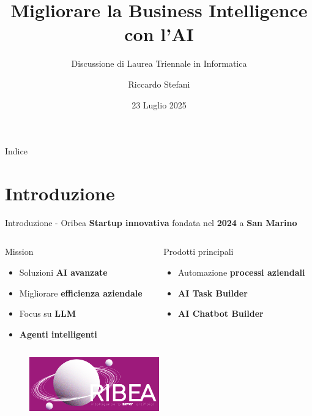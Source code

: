 \documentclass{beamer}
\title{Migliorare la Business Intelligence con l'AI}
\subtitle{Discussione di Laurea Triennale in Informatica}
\author{Riccardo Stefani}
\date{23 Luglio 2025}
\begin{document}
	\maketitle

	\begin{frame}{Indice}
		\tableofcontents
	\end{frame}


	\section{Introduzione}

	\begin{frame}{Introduzione - Oribea}
		\textbf{Startup innovativa} fondata nel \textbf{2024} a \textbf{San Marino}

		\begin{columns}
			\begin{column}{0.5\textwidth}
				\begin{alertblock}{Mission}
					\begin{itemize}
						\item Soluzioni \textbf{AI avanzate}
						\item Migliorare \textbf{efficienza aziendale}
						\item Focus su \textbf{LLM}
						\item \textbf{Agenti intelligenti}
					\end{itemize}
				\end{alertblock}
			\end{column}
			\begin{column}{0.5\textwidth}
				\begin{exampleblock}{Prodotti principali}
					\begin{itemize}
						\item Automazione \textbf{processi aziendali}
						\item \textbf{AI Task Builder}
						\item \textbf{AI Chatbot Builder}
					\end{itemize}
				\end{exampleblock}
			\end{column}
		\end{columns}

		\begin{figure}[h]
			\centering
			\includegraphics[width=0.5\textwidth]{oribea-logo.png}
		\end{figure}
	\end{frame}
\end{document}
